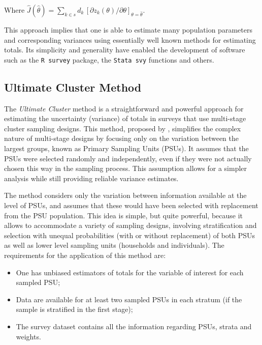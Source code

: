 \documentclass[
  12pt,
]{book}
\begin{document}
Where \(\widehat J (\widehat \theta) = \sum _{k \in s} d_k \, \left[ \partial{z_k ( \theta)} / \partial \theta \right]_{\theta = \widehat \theta}\).

This approach implies that one is able to estimate many population parameters and corresponding variances using essentially well known methods for estimating totals. Its simplicity and generality have enabled the development of software such as the \texttt{R\ survey} package, the \texttt{Stata\ svy} functions and others.

\hypertarget{ultimate-cluster-method}{%
\subsection{Ultimate Cluster Method}\label{ultimate-cluster-method}}

The \emph{Ultimate Cluster} method is a straightforward and powerful approach for estimating the uncertainty (variance) of totals in surveys that use multi-stage cluster sampling designs. This method, proposed by \citet{Hansen1953}, simplifies the complex nature of multi-stage designs by focusing only on the variation between the largest groups, known as Primary Sampling Units (PSUs). It assumes that the PSUs were selected randomly and independently, even if they were not actually chosen this way in the sampling process. This assumption allows for a simpler analysis while still providing reliable variance estimates.

The method considers only the variation between information available at the level of PSUs, and assumes that these would have been selected with replacement from the PSU population. This idea is simple, but quite powerful, because it allows to accommodate a variety of sampling designs, involving stratification and selection with unequal probabilities (with or without replacement) of both PSUs as well as lower level sampling units (households and individuals). The requirements for the application of this method are:

\begin{itemize}
\item
  One has unbiased estimators of totals for the variable of interest for each sampled PSU;
\item
  Data are available for at least two sampled PSUs in each stratum (if the sample is stratified in the first stage);
\item
  The survey dataset contains all the information regarding PSUs, strata and weights.
\end{itemize}
\end{document}
